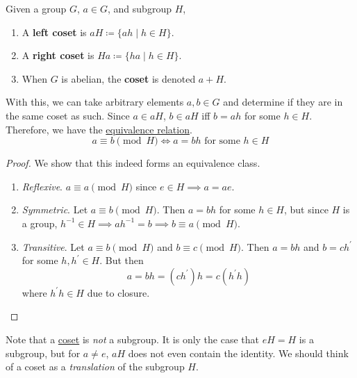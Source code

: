   \begin{definition}[Coset]
    \label{def:coset}
    Given a group $G$, $a \in G$, and subgroup $H$, 
    \begin{enumerate}
      \item A \textbf{left coset} is $a H \coloneqq \{a h \mid h \in H \}$. 
      \item A \textbf{right coset} is $H a \coloneqq \{h a \mid h \in H \}$. 
      \item When $G$ is abelian, the \textbf{coset} is denoted $a + H$. 
    \end{enumerate}
    With this, we can take arbitrary elements $a, b \in G$ and determine if they are in the same coset as such. Since $a \in aH$, $b \in aH$ iff $b = ah$ for some $h \in H$. Therefore, we have the \hyperref[st-def:equivalence_relation]{equivalence relation}. 
    \begin{equation}
      a \equiv b \pmod{H} \iff a = b h \text{ for some } h \in H
    \end{equation}
  \end{definition}
  \begin{proof}
    We show that this indeed forms an equivalence class. 
    \begin{enumerate}
      \item \textit{Reflexive}. $a \equiv a \pmod{H}$ since $e \in H \implies a = a e$. 
      \item \textit{Symmetric}. Let $a \equiv b \pmod{H}$. Then $a = bh$ for some $h \in H$, but since $H$ is a group, $h^{-1} \in H \implies a h^{-1} = b \implies b \equiv a \pmod{H}$. 
      \item \textit{Transitive}. Let $a \equiv b \pmod{H}$ and $b \equiv c \pmod{H}$. Then $a = bh$ and $b = ch^\prime$ for some $h, h^\prime \in H$. But then 
      \begin{equation}
        a = bh = (ch^\prime) h = c(h^\prime h)
      \end{equation}
      where $h^\prime h \in H$ due to closure. 
    \end{enumerate}
  \end{proof} 

  Note that a \hyperref[def:coset]{coset} is \textit{not} a subgroup. It is only the case that $eH = H$ is a subgroup, but for $a \neq e$, $aH$ does not even contain the identity. We should think of a coset as a \textit{translation} of the subgroup $H$. 

